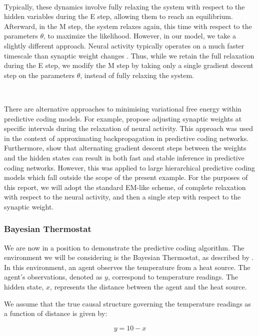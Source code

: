 \documentclass{article}
\begin{document}
\

Typically, these dynamics involve fully relaxing the system with respect to the hidden variables during the E step, allowing them to reach an equilibrium. Afterward, in the M step, the system relaxes again, this time with respect to the parameters $\theta$, to maximize the likelihood. However, in our model, we take a slightly different approach. Neural activity typically operates on a much faster timescale than synaptic weight changes \citep{millidge2024temporal}. Thus, while we retain the full relaxation during the E step, we modify the M step by taking only a single gradient descent step on the parameters $\theta$, instead of fully relaxing the system.

\

There are alternative approaches to minimising variational free energy within predictive coding models. For example, \citet{song2020can} propose adjusting synaptic weights at specific intervals during the relaxation of neural activity. This approach was used in the context of approximating backpropagation in predictive coding networks. Furthermore, \citet{salvatori2024a} show that alternating gradient descent steps between the weights and the hidden states can result in both fast and stable inference in predictive coding networks. However, this was applied to large hierarchical predictive coding models which fall outside the scope of the present example. For the purposes of this report, we will adopt the standard EM-like scheme, of complete relaxation with respect to the neural activity, and then a single step with respect to the synaptic weight.

\subsubsection{Bayesian Thermostat}

We are now in a position to demonstrate the predictive coding algorithm. The environment we will be considering is the Bayesian Thermostat, as described by \citet{buckley2017free}. In this environment, an agent observes the temperature from a heat source. The agent’s observations, denoted as $y$, correspond to temperature readings. The hidden state, $x$, represents the distance between the agent and the heat source.

We assume that the true causal structure governing the temperature readings as a function of distance is given by:

\begin{equation}\label{eq:bayesian_thermostat}
	y = 10 - x
\end{equation}
\end{document}
